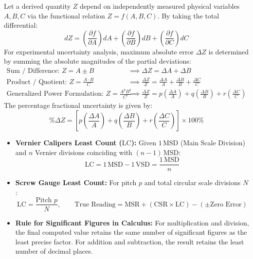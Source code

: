 \documentclass[10pt,a4paper]{article}
\begin{document}
\begin{formulabox}
Let a derived quantity $Z$ depend on independently measured physical variables $A, B, C$ via the functional relation $Z = f(A, B, C)$. By taking the total differential:
\begin{equation}
  dZ = \left(\frac{\partial f}{\partial A}\right) dA + \left(\frac{\partial f}{\partial B}\right) dB + \left(\frac{\partial f}{\partial C}\right) dC
\end{equation}
For experimental uncertainty analysis, maximum absolute error $\Delta Z$ is determined by summing the absolute magnitudes of the partial deviations:
\begin{align}
  \text{Sum / Difference: } Z = A \pm B &\implies \Delta Z = \Delta A + \Delta B \\
  \text{Product / Quotient: } Z = \frac{A \cdot B}{C} &\implies \frac{\Delta Z}{Z} = \frac{\Delta A}{A} + \frac{\Delta B}{B} + \frac{\Delta C}{C} \\
  \text{Generalized Power Formulation: } Z = \frac{A^p B^q}{C^r} &\implies \frac{\Delta Z}{Z} = p\left(\frac{\Delta A}{A}\right) + q\left(\frac{\Delta B}{B}\right) + r\left(\frac{\Delta C}{C}\right)
\end{align}
The percentage fractional uncertainty is given by:
\begin{equation}
  \% \Delta Z = \left[ p\left(\frac{\Delta A}{A}\right) + q\left(\frac{\Delta B}{B}\right) + r\left(\frac{\Delta C}{C}\right) \right] \times 100\%
\end{equation}
\end{formulabox}

\begin{usecasebox}
\begin{itemize}
  \item \textbf{Vernier Calipers Least Count ($\mathrm{LC}$):} Given $1\,\mathrm{MSD}$ (Main Scale Division) and $n$ Vernier divisions coinciding with $(n-1)\,\mathrm{MSD}$:
  \begin{equation}
    \mathrm{LC} = 1\,\mathrm{MSD} - 1\,\mathrm{VSD} = \frac{1\,\mathrm{MSD}}{n}
  \end{equation}
  \item \textbf{Screw Gauge Least Count:} For pitch $p$ and total circular scale divisions $N$:
  \begin{equation}
    \mathrm{LC} = \frac{\text{Pitch } p}{N}, \qquad \text{True Reading} = \text{MSR} + (\text{CSR} \times \mathrm{LC}) - (\pm \text{Zero Error})
  \end{equation}
  \item \textbf{Rule for Significant Figures in Calculus:} For multiplication and division, the final computed value retains the same number of significant figures as the least precise factor. For addition and subtraction, the result retains the least number of decimal places.
\end{itemize}
\end{usecasebox}
\end{document}
